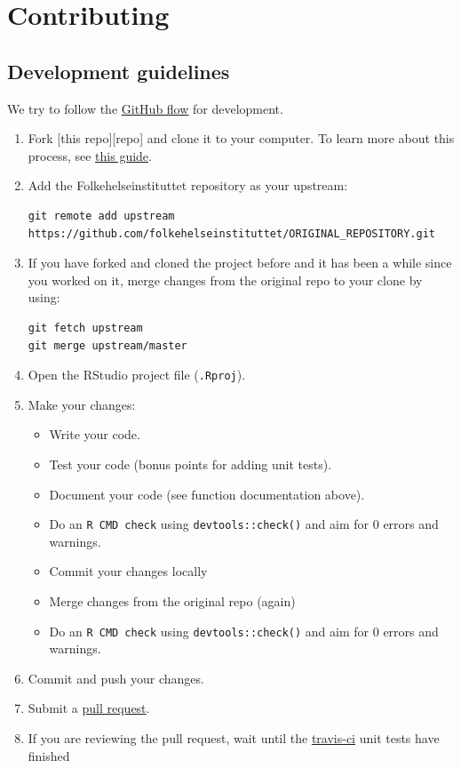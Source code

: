 \documentclass[12pt,]{article}
\providecommand{\tightlist}{%
  \setlength{\itemsep}{0pt}\setlength{\parskip}{0pt}}
\begin{document}
\section{Contributing}\label{contributing}

\subsection{Development guidelines}\label{development-guidelines}

We try to follow the
\href{https://guides.github.com/introduction/flow/}{GitHub flow} for
development.

\begin{enumerate}
\def\labelenumi{\arabic{enumi}.}
\item
  Fork {[}this repo{]}{[}repo{]} and clone it to your computer. To learn
  more about this process, see
  \href{https://guides.github.com/activities/forking/}{this guide}.
\item
  Add the Folkehelseinstituttet repository as your upstream:

\begin{verbatim}
git remote add upstream https://github.com/folkehelseinstituttet/ORIGINAL_REPOSITORY.git
\end{verbatim}
\item
  If you have forked and cloned the project before and it has been a
  while since you worked on it, merge changes from the original repo to
  your clone by using:

\begin{verbatim}
git fetch upstream
git merge upstream/master
\end{verbatim}
\item
  Open the RStudio project file (\texttt{.Rproj}).
\item
  Make your changes:

  \begin{itemize}
  \tightlist
  \item
    Write your code.
  \item
    Test your code (bonus points for adding unit tests).
  \item
    Document your code (see function documentation above).
  \item
    Do an \texttt{R\ CMD\ check} using \texttt{devtools::check()} and
    aim for 0 errors and warnings.
  \item
    Commit your changes locally
  \item
    Merge changes from the original repo (again)
  \item
    Do an \texttt{R\ CMD\ check} using \texttt{devtools::check()} and
    aim for 0 errors and warnings.
  \end{itemize}
\item
  Commit and push your changes.
\item
  Submit a
  \href{https://guides.github.com/activities/forking/\#making-a-pull-request}{pull
  request}.
\item
  If you are reviewing the pull request, wait until the
  \href{www.travis-ci.org}{travis-ci} unit tests have finished
\end{enumerate}
\end{document}
